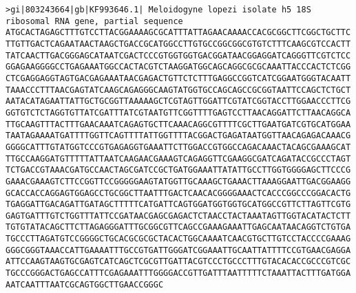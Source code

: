\documentclass[11pt]{article}
\begin{document}
\begin{Verbatim}[commandchars=\\\{\}]
>gi|803243664|gb|KF993646.1| Meloidogyne lopezi isolate h5 18S ribosomal RNA gene, partial sequence
ATGCACTAGAGCTTTGTCCTTACGGAAAAGCGCATTTATTAGAACAAAACCACGCGGCTTCGGCTGCTTC
TTGTTGACTCAGAATAACTAAGCTGACCGCATGGCCTTGTGCCGGCGGCGTGTCTTTCAAGCGTCCACTT
TATCAACTTGACGGGAGCATAATCGACTCCCGTGGTGGTGACGGATAACGGAGGATCAGGGTTCGTCTCC
GGAGAAGGGGCCTGAGAAATGGCCACTACGTCTAAGGATGGCAGCAGGCGCGCAAATTACCCACTCTCGG
CTCGAGGAGGTAGTGACGAGAAATAACGAGACTGTTCTCTTTGAGGCCGGTCATCGGAATGGGTACAATT
TAAACCCTTTAACGAGTATCAAGCAGAGGGCAAGTATGGTGCCAGCAGCCGCGGTAATTCCAGCTCTGCT
AATACATAGAATTATTGCTGCGGTTAAAAAGCTCGTAGTTGGATTCGTATCGGTACCTTGGAACCCTTCG
GGTGTCTCTAGGTGTTATCGATTTATCGTAATGTTCGGTTTTGAGTCCTTAACAGGATTCTTAACAGGCA
TTGCAAGTTTACTTTGAACAAATCAGAGTGCTTCAAACAGGCGTTTTCGCTTGAATGATCGTGCATGGAA
TAATAGAAAATGATTTTGGTTCAGTTTTATTGGTTTTACGGACTGAGATAATGGTTAACAGAGACAAACG
GGGGCATTTGTATGGTCCCGTGAGAGGTGAAATTCTTGGACCGTGGCCAGACAAACTACAGCGAAAGCAT
TTGCCAAGGATGTTTTTATTAATCAAGAACGAAAGTCAGAGGTTCGAAGGCGATCAGATACCGCCCTAGT
TCTGACCGTAAACGATGCCAACTAGCGATCCGCTGATGGAAATTATATTGCCTTGGTGGGGAGCTTCCCG
GAAACGAAAGTCTTCCGGTTCCGGGGGAAGTATGGTTGCAAAGCTGAAACTTAAAGGAATTGACGGAAGG
GCACCACCAGGAGTGGAGCCTGCGGCTTAATTTGACTCAACACGGGGAAACTCACCCGGCCCGGACACTG
TGAGGATTGACAGATTGATAGCTTTTTCATGATTCAGTGGATGGTGGTGCATGGCCGTTCTTAGTTCGTG
GAGTGATTTGTCTGGTTTATTCCGATAACGAGCGAGACTCTAACCTACTAAATAGTTGGTACATACTCTT
TGTGTATACAGCTTCTTAGAGGGATTTGCGGCGTTCAGCCGAAAGAAATTGAGCAATAACAGGTCTGTGA
TGCCCTTAGATGTCCGGGGCTGCACGCGCGCTACACTGGCAAAATCAACGTGCTTGTCCTACCCCGAAAG
GGGCGGGTAAACCATTGAAAATTTGCCGTGATTGGGATCGGAAATTGCAATTATTTTCCGTGAACGAGGA
ATTCCAAGTAAGTGCGAGTCATCAGCTCGCGTTGATTACGTCCCTGCCCTTTGTACACACCGCCCGTCGC
TGCCCGGGACTGAGCCATTTCGAGAAATTTGGGGACCGTTGATTTAATTTTTCTAAATTACTTTGATGGA
AATCAATTTAATCGCAGTGGCTTGAACCGGGC


\end{Verbatim}
\end{document}
